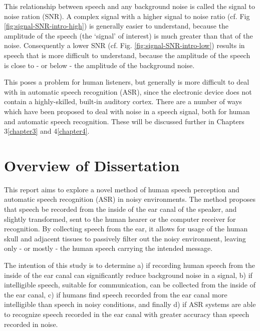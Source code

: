\documentclass[dissertation,copyright]{uathesis}
\begin{document}
This relationship between speech and any background noise is called the signal to noise ration (SNR).  A complex signal with a higher signal to noise ratio (cf. Fig \ref{fig:signal-SNR-intro-high}) is generally easier to understand, because the amplitude of the speech (the `signal' of interest) is much greater than that of the noise.  Consequently a lower SNR (cf. Fig. \ref{fig:signal-SNR-intro-low}) results in speech that is more difficult to understand, because the amplitude of the speech is close to - or below - the amplitude of the background noise.

This poses a problem for human listeners, but generally is more difficult to deal with in automatic speech recognition (ASR), since the electronic device does not contain a highly-skilled, built-in auditory cortex.  There are a number of ways which have been proposed to deal with noise in a speech signal, both for human and automatic speech recognition.  These will be discussed further in Chapters 3\ref{chapter3} and 4\ref{chapter4}.

\section{Overview of Dissertation}\label{ch1:diss-overview}

This report aims to explore a novel method of human speech perception and automatic speech recognition (ASR) in noisy environments.  The method proposes that speech be recorded from the inside of the ear canal of the speaker, and slightly transformed, sent to the human hearer or the computer receiver for recognition.  By collecting speech from the ear, it allows for usage of the human skull and adjacent tissues to passively filter out the noisy environment, leaving only - or mostly - the human speech carrying the intended message.  
	
The intention of this study is to determine a) if recording human speech from the inside of the ear canal can significantly reduce background noise in a signal, b) if intelligible speech, suitable for communication, can be collected from the inside of the ear canal, c) if humans find speech recorded from the ear canal more intelligible than speech in noisy conditions, and finally d) if ASR systems are able to recognize speech recorded in the ear canal with greater accuracy than speech recorded in noise.
	
\end{document}
